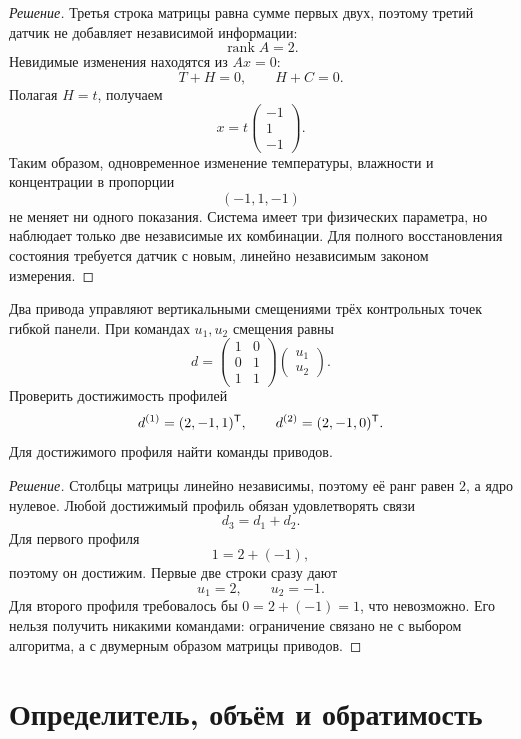 \begin{proof}[Решение]
Третья строка матрицы равна сумме первых двух, поэтому третий датчик не добавляет независимой информации:
\[
\operatorname{rank}A=2.
\]
Невидимые изменения находятся из \(Ax=0\):
\[
T+H=0,
\qquad
H+C=0.
\]
Полагая \(H=t\), получаем
\[
x=t
\begin{pmatrix}-1\\1\\-1\end{pmatrix}.
\]
Таким образом, одновременное изменение температуры, влажности и концентрации в пропорции
\[
(-1,1,-1)
\]
не меняет ни одного показания. Система имеет три физических параметра, но наблюдает только две независимые их комбинации. Для полного восстановления состояния требуется датчик с новым, линейно независимым законом измерения.
\end{proof}

\begin{problem}
Два привода управляют вертикальными смещениями трёх контрольных точек гибкой панели. При командах \(u_1,u_2\) смещения равны
\[
d=
\begin{pmatrix}
1&0\\
0&1\\
1&1
\end{pmatrix}
\begin{pmatrix}u_1\\u_2\end{pmatrix}.
\]
Проверить достижимость профилей
\[
d^{(1)}=(2,-1,1)^{\mathsf{T}},
\qquad
 d^{(2)}=(2,-1,0)^{\mathsf{T}}.
\]
Для достижимого профиля найти команды приводов.
\end{problem}

\begin{proof}[Решение]
Столбцы матрицы линейно независимы, поэтому её ранг равен \(2\), а ядро нулевое. Любой достижимый профиль обязан удовлетворять связи
\[
d_3=d_1+d_2.
\]
Для первого профиля
\[
1=2+(-1),
\]
поэтому он достижим. Первые две строки сразу дают
\[
u_1=2,
\qquad
u_2=-1.
\]
Для второго профиля требовалось бы \(0=2+(-1)=1\), что невозможно. Его нельзя получить никакими командами: ограничение связано не с выбором алгоритма, а с двумерным образом матрицы приводов.
\end{proof}

\section{Определитель, объём и обратимость}
\label{sec:determinant}

